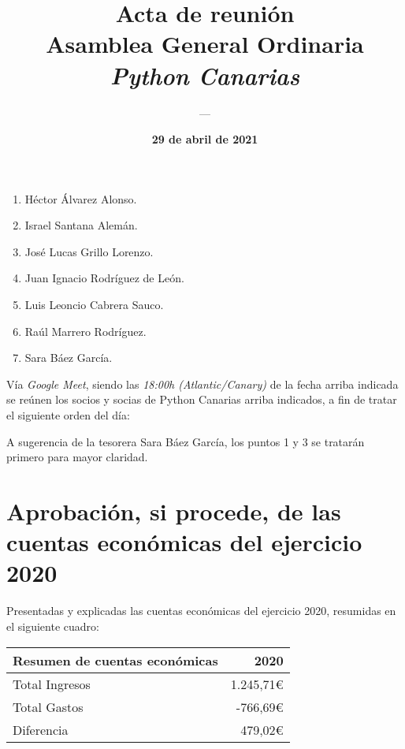 \documentclass[a4paper,12pt]{article}
\title{\huge \textbf{Acta de reunión} \\ Asamblea General Ordinaria \\ \textit{Python Canarias}}
\date{\textbf{29 de abril de 2021}}
\author{---}
\begin{document}
\renewcommand{\contentsname}{Orden del día}

\maketitle

\begin{enumerate}
    \item Héctor Álvarez Alonso.
    \item Israel Santana Alemán.
    \item José Lucas Grillo Lorenzo.
    \item Juan Ignacio Rodríguez de León.
    \item Luis Leoncio Cabrera Sauco.
    \item Raúl Marrero Rodríguez.
    \item Sara Báez García.
\end{enumerate}

Vía \textit{Google Meet}, siendo las \textit{18:00h (Atlantic/Canary)} de la fecha arriba indicada se reúnen los socios y socias de Python Canarias arriba indicados, a fin de tratar el siguiente orden del día:

\tableofcontents

\vspace{1cm}

A sugerencia de la tesorera Sara Báez García, los puntos 1 y 3 se tratarán primero para mayor claridad.

\section{Aprobación, si procede, de las cuentas económicas del ejercicio 2020}

Presentadas y explicadas las cuentas económicas del ejercicio 2020, resumidas en el siguiente cuadro:

\begin{center}
    \begin{tabular}{ | l | r | }
        \hline
        \textbf{Resumen de cuentas económicas} & \textbf{2020} \\ 
        \hline
        Total Ingresos & 1.245,71\euro \\  
        \hline
        Total Gastos & -766,69\euro \\  
        \hline
        \hline
        Diferencia & 479,02\euro \\  
        \hline
    \end{tabular}
\end{center}
\end{document}
